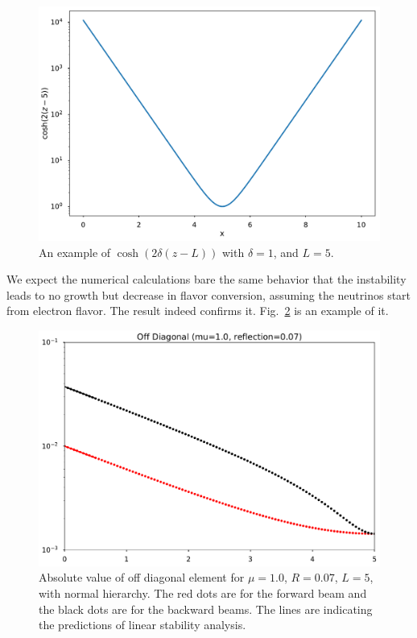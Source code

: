\begin{figure}[!htbp]
    \centering
    \includegraphics[width=\textwidth]{chapters/assets/halo/cosh.pdf}
    \caption{ An example of $\cosh(2\delta(z-L))$ with $\delta=1$, and $L=5$.}
    \label{chap:halo-sec:line-sym-fig:cosh}
\end{figure}


We expect the numerical calculations bare the same behavior that the instability leads to no growth but decrease in flavor conversion, assuming the neutrinos start from electron flavor. The result indeed confirms it. Fig.~\ref{chap:halo-sec:line-sym-fig:mu-1.0-reflection-0.07} is an example of it.

\begin{figure}[htbp]
    \centering
    \includegraphics[width=\textwidth]{chapters/assets/halo/mu-1-reflection-0p07.pdf}
    \caption{Absolute value of off diagonal element for $\mu=1.0$, $R=0.07$, $L=5$, with normal hierarchy. The red dots are for the forward beam and the black dots are for the backward beams. The lines are indicating the predictions of linear stability analysis.}
    \label{chap:halo-sec:line-sym-fig:mu-1.0-reflection-0.07}
\end{figure}

